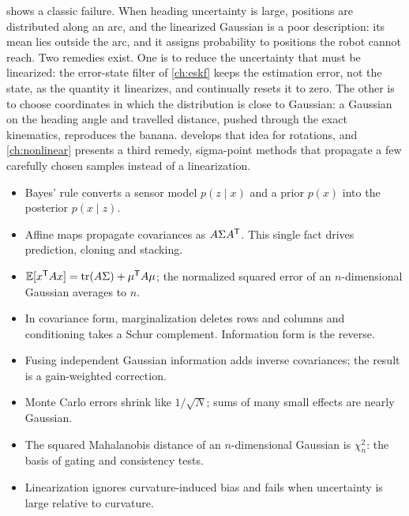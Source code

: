  shows a classic failure. When heading uncertainty is large, positions are distributed along an arc, and the linearized Gaussian
is a poor description: its mean lies outside the arc, and it assigns probability to positions the robot cannot reach. Two remedies exist.
One is to reduce the uncertainty that must be linearized: the error-state filter of \cref{ch:eskf} keeps the estimation error, not the state,
as the quantity it linearizes, and continually resets it to zero. The other is to choose coordinates in which the distribution is close to
Gaussian: a Gaussian on the heading angle and travelled distance, pushed through the exact kinematics, reproduces the banana. 
develops that idea for rotations, and \cref{ch:nonlinear} presents a third remedy, sigma-point methods that propagate a few carefully chosen
samples instead of a linearization.

\begin{takeaways}
\begin{itemize}
  \item Bayes' rule converts a sensor model $p(z\mid x)$ and a prior $p(x)$ into the posterior $p(x\mid z)$.
  \item Affine maps propagate covariances as $A\Sigma A^{\mathsf{T}}$. This single fact drives prediction, cloning and stacking.
  \item $\mathbb{E}[x^{\mathsf{T}} Ax] = \operatorname{tr}(A\Sigma) + \mu^{\mathsf{T}} A\mu$; the normalized squared error of an $n$-dimensional Gaussian averages to $n$.
  \item In covariance form, marginalization deletes rows and columns and conditioning takes a Schur complement. Information form is the reverse.
  \item Fusing independent Gaussian information adds inverse covariances; the result is a gain-weighted correction.
  \item Monte Carlo errors shrink like $1/\sqrt N$; sums of many small effects are nearly Gaussian.
  \item The squared Mahalanobis distance of an $n$-dimensional Gaussian is $\chi^2_n$: the basis of gating and consistency tests.
  \item Linearization ignores curvature-induced bias and fails when uncertainty is large relative to curvature.
\end{itemize}
\end{takeaways}

